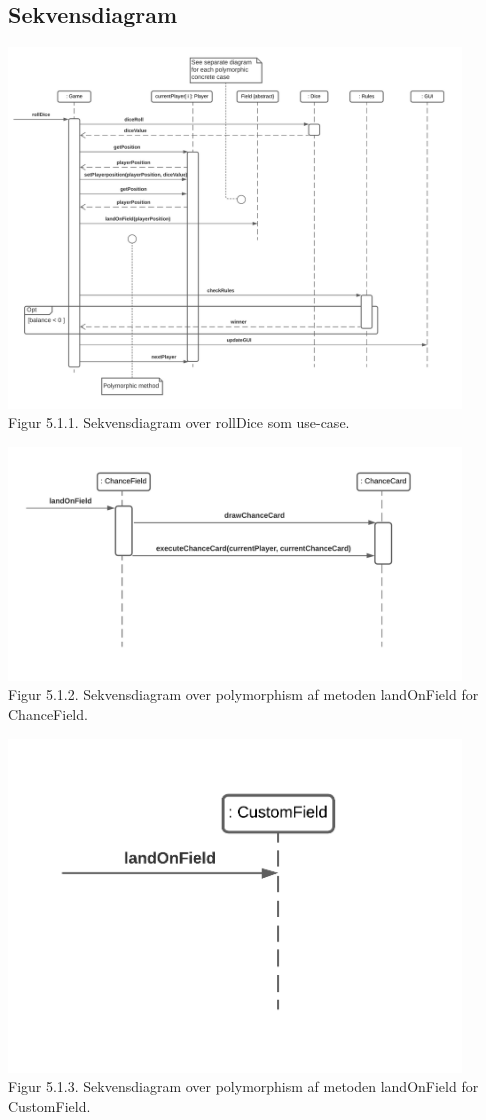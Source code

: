 \begin{flushleft}

\subsection{Sekvensdiagram}
\includegraphics[width=0.9\textwidth]{Report/figures/Sekvensdiagram1.png}~\\[1cm]
Figur 5.1.1. Sekvensdiagram over rollDice som use-case.

\includegraphics[width=0.9\textwidth]{Report/figures/Sekvensdiagram_ChanceField.png}~\\[1cm]
Figur 5.1.2. Sekvensdiagram over polymorphism af metoden landOnField for ChanceField.


\includegraphics[width=0.9\textwidth]{Report/figures/Sekvensdiagram_CustomField.png}~\\[1cm]
Figur 5.1.3. Sekvensdiagram over polymorphism af metoden landOnField for CustomField.



\end{flushleft}

